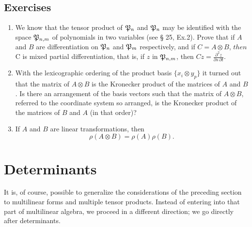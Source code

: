 {\small
\subsection*{Exercises}
\begin{enumerate}[wide]
    \item We know that the tensor product of \(\mathfrak{P}_n\) and \(\mathfrak{P}_n\)
    may be identified with the space \(\mathfrak{P}_{n,m}\) of polynomials in two
    variables (see § 25, Ex.2). Prove that if \(A\) and \(B\) are
    differentiation on \(\mathfrak{P}_n\) and \(\mathfrak{P}_m\) respectively, and if
    \(C = A \otimes B\), \(then\) C is mixed partial differentiation, that is,
    if \(z\) in \(\mathfrak{P}_{n,m}\), then \(\displaystyle Cz =
    \frac{\partial^2z}{\partial s\,\partial t}\).
    
    \item With the lexicographic ordering of the product basis \(\{x_i \otimes
    y_p\}\) it turned out that the matrix of \(A \otimes B\) is the Kronecker
    product of the matrices of \(A\) and \(B\). Is there an arrangement of the
    basis vectors such that the matrix of \(A \otimes B\), referred to the
    coordinate system so arranged, is the Kronecker product of the matrices of
    \(B\) and \(A\) (in that order)?

    \item If \(A\) and \(B\) are linear transformations, then
    \begin{equation*}
        \rho (A \otimes B) = \rho (A) \rho (B).
    \end{equation*}
\end{enumerate}
}

\section{Determinants}\label{sec-determinants}

It is, of course, possible to generalize the considerations of the preceding
section to multilinear forms and multiple tensor products. Instead of entering
into that part of multilinear algebra, we proceed in a different direction; we
go directly after determinants.

